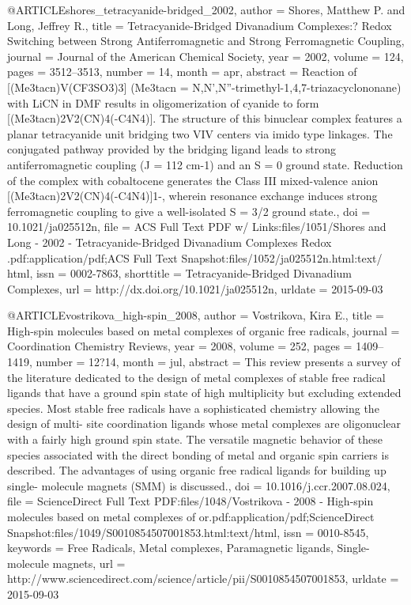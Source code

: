 @ARTICLE{shores_tetracyanide-bridged_2002,
  author = {Shores, Matthew P. and Long, Jeffrey R.},
  title = {Tetracyanide-{Bridged} {Divanadium} {Complexes}:? {Redox} {Switching}
	between {Strong} {Antiferromagnetic} and {Strong} {Ferromagnetic}
	{Coupling}},
  journal = {Journal of the American Chemical Society},
  year = {2002},
  volume = {124},
  pages = {3512--3513},
  number = {14},
  month = apr,
  abstract = {Reaction of [(Me3tacn)V(CF3SO3)3] (Me3tacn = N,N',N''-trimethyl-1,4,7-triazacyclononane)
	with LiCN in DMF results in oligomerization of cyanide to form [(Me3tacn)2V2(CN)4(-C4N4)].
	The structure of this binuclear complex features a planar tetracyanide
	unit bridging two VIV centers via imido type linkages. The conjugated
	pathway provided by the bridging ligand leads to strong antiferromagnetic
	coupling (J = 112 cm-1) and an S = 0 ground state. Reduction of the
	complex with cobaltocene generates the Class III mixed-valence anion
	[(Me3tacn)2V2(CN)4(-C4N4)]1-, wherein resonance exchange induces
	strong ferromagnetic coupling to give a well-isolated S = 3/2 ground
	state.},
  doi = {10.1021/ja025512n},
  file = {ACS Full Text PDF w/ Links:files/1051/Shores and Long - 2002 - Tetracyanide-Bridged           Divanadium Complexes  Redox .pdf:application/pdf;ACS Full Text Snapshot:files/1052/ja025512n.html:text/   html},
  issn = {0002-7863},
  shorttitle = {Tetracyanide-{Bridged} {Divanadium} {Complexes}},
  url = {http://dx.doi.org/10.1021/ja025512n},
  urldate = {2015-09-03}
}

@ARTICLE{vostrikova_high-spin_2008,
  author = {Vostrikova, Kira E.},
  title = {High-spin molecules based on metal complexes of organic free radicals},
  journal = {Coordination Chemistry Reviews},
  year = {2008},
  volume = {252},
  pages = {1409--1419},
  number = {12?14},
  month = jul,
  abstract = {This review presents a survey of the literature dedicated to the design
	of metal complexes of stable free radical ligands that have a ground
	spin state of high multiplicity but excluding extended species. Most
	stable free radicals have a sophisticated chemistry allowing the
	design of multi- site coordination ligands whose metal complexes
	are oligonuclear with a fairly high ground spin state. The versatile
	magnetic behavior of these species associated with the direct bonding
	of metal and organic spin carriers is described. The advantages of
	using organic free radical ligands for building up single- molecule
	magnets (SMM) is discussed.},
  doi = {10.1016/j.ccr.2007.08.024},
  file = {ScienceDirect Full Text PDF:files/1048/Vostrikova - 2008 - High-spin molecules based on metal complexes of or.pdf:application/pdf;ScienceDirect Snapshot:files/1049/S0010854507001853.html:text/html},
  issn = {0010-8545},
  keywords = {Free Radicals, Metal complexes, Paramagnetic ligands, Single-molecule
	magnets},
  url = {http://www.sciencedirect.com/science/article/pii/S0010854507001853},
  urldate = {2015-09-03}
}

